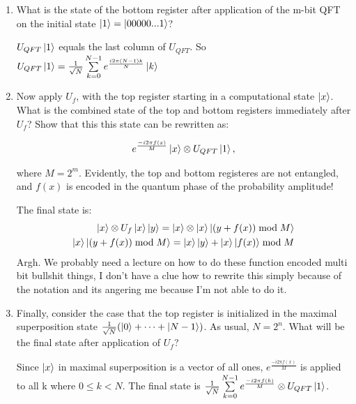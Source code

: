 \documentclass[12pt]{article}
\newcommand{\rsqrt}[1]{\ensuremath{\frac{1}{\sqrt{#1}}}}
\newenvironment{answer}{\begingroup\setlength{\leftskip}{-\leftmargin}\begin{framed}}{\end{framed}\endgroup}
\begin{document}
\begin{enumerate}

    \item What is the state of the bottom register after application of the m-bit QFT on the initial
state $\ket{1} = \ket{00000...1}$?

    \begin{answer}
        $U_{QFT}\ket{1}$ equals the last column of $U_{QFT}$. So $U_{QFT}\ket{1} = \rsqrt{N}\sum\limits_{k = 0}^{N - 1}e^{\frac{i2\pi{}(N - 1)k}{N}}\ket{k}$
    \end{answer}

    \item Now apply $U_f$, with the top register starting in a computational state $\ket{x}$. What is the combined state of the top and bottom registers immediately after $U_f$? Show that this this state can be rewritten as:

    \begin{align*}
        e^{\frac{-i2\pi{}f(x)}{M}}\ket{x}\otimes{}U_{QFT}\ket{1},
    \end{align*}

    where $M = 2^m$. Evidently, the top and bottom registeres are not entangled, and $f(x)$ is encoded in the quantum phase of the probability amplitude!

    \begin{answer}
        The final state is:
        \begin{align*}
            \ket{x} \otimes U_f\ket{x}\ket{y} = \ket{x} \otimes \ket{x}\ket{(y + f(x)) \bmod M} \\
            \ket{x}\ket{(y + f(x)) \bmod M} = \ket{x}\ket{y} + \ket{x}\ket{f(x)} \bmod M \\
        \end{align*}
        Argh. We probably need a lecture on how to do these function encoded multi bit bullshit things, I don't have a clue how to rewrite this simply because of the notation and its angering me because I'm not able to do it.
    \end{answer}

    \item Finally, consider the case that the top register is initialized in the maximal superposition state $\rsqrt{N}(\ket{0} + \dots + \ket{N - 1})$. As usual, $N = 2^n$. What will be the final state after application of $U_f$?

    \begin{answer}
        Since $\ket{x}$ in maximal superposition is a vector of all ones, $e^{\frac{-i2\pi{}f(x)}{M}}$ is applied to all k where $0 \le k < N$. The final state is $\rsqrt{N}\sum\limits_{k = 0}^{N - 1}e^{\frac{-i2\pi{}f(k)}{M}} \otimes U_{QFT}\ket{1}$.
    \end{answer}

\end{enumerate}
\end{document}
